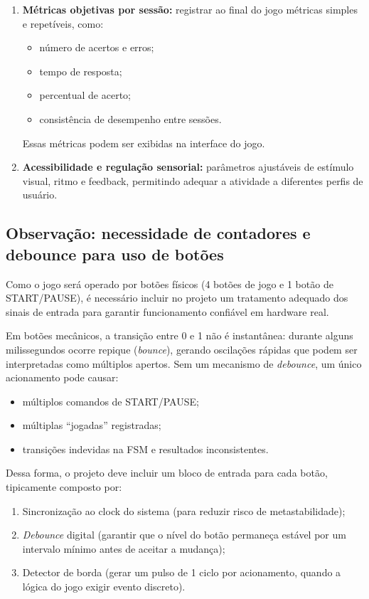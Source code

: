 \documentclass[a4paper,12pt,twoside]{article}
\begin{document}
\begin{enumerate}
    \item \textbf{Métricas objetivas por sessão:} registrar ao final do jogo métricas simples e repetíveis, como:
    \begin{itemize}
        \item número de acertos e erros;
        \item tempo de resposta;
        \item percentual de acerto;
        \item consistência de desempenho entre sessões.
    \end{itemize}
    Essas métricas podem ser exibidas na interface do jogo.

    \item \textbf{Acessibilidade e regulação sensorial:} parâmetros ajustáveis de estímulo visual, ritmo e feedback, permitindo adequar a atividade a diferentes perfis de usuário.
\end{enumerate}

\subsection{Observação: necessidade de contadores e debounce para uso de botões}
Como o jogo será operado por botões físicos (4 botões de jogo e 1 botão de START/PAUSE), é necessário incluir no projeto um tratamento adequado dos sinais de entrada para garantir funcionamento confiável em hardware real.

Em botões mecânicos, a transição entre 0 e 1 não é instantânea: durante alguns milissegundos ocorre repique (\emph{bounce}), gerando oscilações rápidas que podem ser interpretadas como múltiplos apertos. Sem um mecanismo de \emph{debounce}, um único acionamento pode causar:

\begin{itemize}
    \item múltiplos comandos de START/PAUSE;
    \item múltiplas ``jogadas'' registradas;
    \item transições indevidas na FSM e resultados inconsistentes.
\end{itemize}

Dessa forma, o projeto deve incluir um bloco de entrada para cada botão, tipicamente composto por:

\begin{enumerate}
    \item Sincronização ao clock do sistema (para reduzir risco de metastabilidade);
    \item \emph{Debounce} digital (garantir que o nível do botão permaneça estável por um intervalo mínimo antes de aceitar a mudança);
    \item Detector de borda (gerar um pulso de 1 ciclo por acionamento, quando a lógica do jogo exigir evento discreto).
\end{enumerate}
\end{document}
